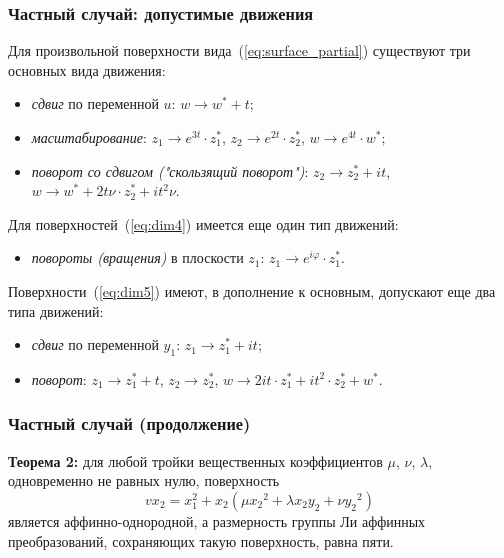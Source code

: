 \documentclass[russian,hyperref={unicode}]{beamer}
\begin{document}
{
	\frametitle{Частный случай: допустимые движения}
	Для произвольной поверхности вида~(\ref{eq:surface_partial}) существуют три основных вида движения:
	\begin{itemize}
		\item \emph{сдвиг} по переменной $u$: $w \to w^{\ast} + t$;
		\item \emph{масштабирование}: $z_1 \to e^{3t} \cdot z_1^{\ast}$, $z_2 \to e^{2t} \cdot z_2^{\ast}$, $w \to e^{4t} \cdot w^{\ast}$;
		\item \emph{поворот со сдвигом ("скользящий поворот")}: $z_2 \to z_2^{\ast} + i t$, $w \to w^{\ast} + 2 t \nu \cdot z_2^{\ast} + i t^2 \nu$.
	\end{itemize} 
	
	Для поверхностей~(\ref{eq:dim4}) имеется еще один тип движений:
	\begin{itemize}
		\item \emph{повороты (вращения)} в плоскости $z_1$: $z_1 \to e^{i \varphi}  \cdot z_1^{\ast}$.
	\end{itemize}
	
	Поверхности~(\ref{eq:dim5}) имеют, в дополнение к основным, допускают еще два типа движений:
	\begin{itemize}
		\item \emph{сдвиг} по переменной $y_1$: $z_1 \to z_1^{\ast} + i t$; 
		\item \emph{поворот}: $z_1 \to z_1^{\ast} + t$, $z_2 \to z_2^{\ast}$, $w \to 2 i t \cdot z_1^{\ast} +  i t^2 \cdot z_2^{\ast} + w^{\ast}$.
	\end{itemize}
}
\frame
{
	\frametitle{Частный случай (продолжение)}
	\textbf{Теорема 2:}
	для любой тройки вещественных коэффициентов $\mu$, $\nu$, $\lambda$, 
	одновременно не равных нулю, поверхность
	\begin{equation*}
		v x_2 = x_1^2 + x_2 (\mu {x_2}^2 + \lambda x_2 y_2 + \nu {y_2}^2)	
	\end{equation*}
	является аффинно-однородной, а размерность группы Ли аффинных преобразований,   
    сохраняющих такую поверхность, равна пяти.
}
\end{document}
